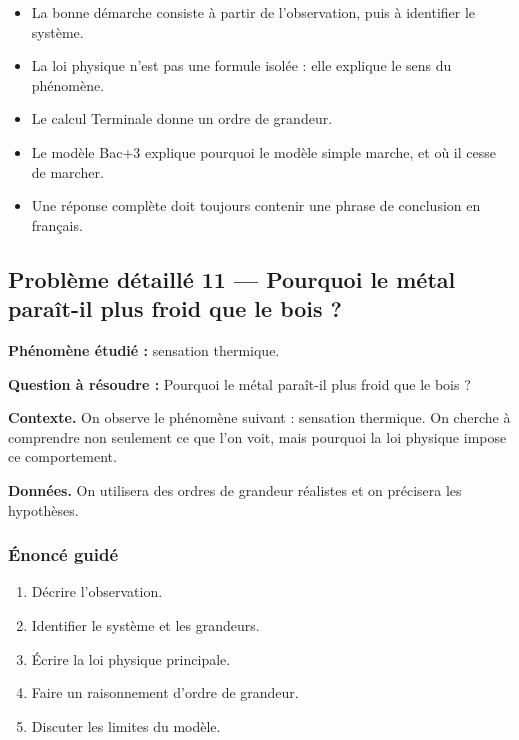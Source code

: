 \documentclass[11pt,a4paper]{article}
\begin{document}
\begin{methodebox}
\begin{itemize}
  \item La bonne démarche consiste à partir de l'observation, puis à identifier le système.
  \item La loi physique n'est pas une formule isolée : elle explique le sens du phénomène.
  \item Le calcul Terminale donne un ordre de grandeur.
  \item Le modèle Bac+3 explique pourquoi le modèle simple marche, et où il cesse de marcher.
  \item Une réponse complète doit toujours contenir une phrase de conclusion en français.
\end{itemize}
\end{methodebox}

\subsection{Problème détaillé 11 — Pourquoi le métal paraît-il plus froid que le bois ?}

\begin{exercicebox}
\textbf{Phénomène étudié :} sensation thermique.

\medskip
\textbf{Question à résoudre :} Pourquoi le métal paraît-il plus froid que le bois ?

\medskip
\textbf{Contexte.} On observe le phénomène suivant : sensation thermique. On cherche à comprendre non seulement ce que l'on voit, mais pourquoi la loi physique impose ce comportement.

\medskip
\textbf{Données.} On utilisera des ordres de grandeur réalistes et on précisera les hypothèses.
\end{exercicebox}

\subsubsection*{Énoncé guidé}

\begin{enumerate}
  \item Décrire l'observation.
  \item Identifier le système et les grandeurs.
  \item Écrire la loi physique principale.
  \item Faire un raisonnement d'ordre de grandeur.
  \item Discuter les limites du modèle.
\end{enumerate}
\end{document}
